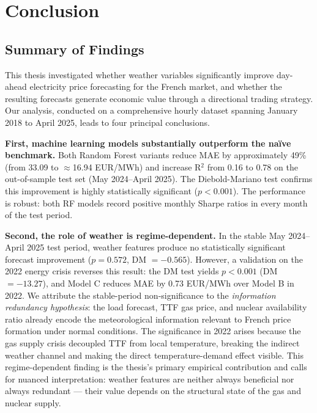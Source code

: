 \chapter{Conclusion}
\label{chap:conclusion}

\section{Summary of Findings}

This thesis investigated whether weather variables significantly improve day-ahead electricity price forecasting for the French market, and whether the resulting forecasts generate economic value through a directional trading strategy. Our analysis, conducted on a comprehensive hourly dataset spanning January 2018 to April 2025, leads to four principal conclusions.

\textbf{First, machine learning models substantially outperform the na\"{i}ve benchmark.} Both Random Forest variants reduce MAE by approximately 49\% (from 33.09 to $\approx$16.94 EUR/MWh) and increase R$^2$ from 0.16 to 0.78 on the out-of-sample test set (May 2024--April 2025). The Diebold-Mariano test confirms this improvement is highly statistically significant ($p < 0.001$). The performance is robust: both RF models record positive monthly Sharpe ratios in every month of the test period.

\textbf{Second, the role of weather is regime-dependent.} In the stable
May 2024--April 2025 test period, weather features produce no statistically
significant forecast improvement ($p = 0.572$, DM $= -0.565$). However, a
validation on the 2022 energy crisis reverses this result: the DM test yields
$p < 0.001$ (DM $= -13.27$), and Model C reduces MAE by 0.73 EUR/MWh over
Model B in 2022. We attribute the stable-period non-significance to the
\textit{information redundancy hypothesis}: the load forecast, TTF gas price,
and nuclear availability ratio already encode the meteorological information
relevant to French price formation under normal conditions. The significance
in 2022 arises because the gas supply crisis decoupled TTF from local
temperature, breaking the indirect weather channel and making the direct
temperature-demand effect visible. This regime-dependent finding is the thesis's
primary empirical contribution and calls for nuanced interpretation: weather
features are neither always beneficial nor always redundant — their value
depends on the structural state of the gas and nuclear supply.

